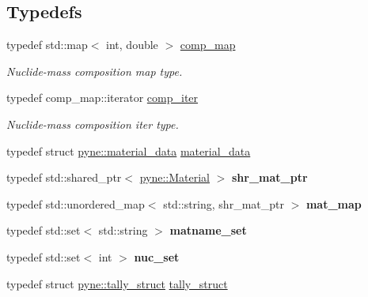 \subsection*{Typedefs}
\begin{DoxyCompactItemize}
\item 
\mbox{\label{namespacepyne_a86738cecccf4ce3f4ecc2ff6f45ce1a2}} 
typedef std\+::map$<$ int, double $>$ \hyperlink{namespacepyne_a86738cecccf4ce3f4ecc2ff6f45ce1a2}{comp\+\_\+map}
\begin{DoxyCompactList}\small\item\em Nuclide-\/mass composition map type. \end{DoxyCompactList}\item 
\mbox{\label{namespacepyne_af38f60eec2c4c80e6decc75c3b21a879}} 
typedef comp\+\_\+map\+::iterator \hyperlink{namespacepyne_af38f60eec2c4c80e6decc75c3b21a879}{comp\+\_\+iter}
\begin{DoxyCompactList}\small\item\em Nuclide-\/mass composition iter type. \end{DoxyCompactList}\item 
typedef struct \hyperlink{structpyne_1_1material__data}{pyne\+::material\+\_\+data} \hyperlink{namespacepyne_a30fee8818307aa6d8d45dc33ddee6008}{material\+\_\+data}
\item 
\mbox{\label{namespacepyne_a09ce84044845a9b4a1ec41e4205c6ce6}} 
typedef std\+::shared\+\_\+ptr$<$ \hyperlink{classpyne_1_1_material}{pyne\+::\+Material} $>$ {\bfseries shr\+\_\+mat\+\_\+ptr}
\item 
\mbox{\label{namespacepyne_adf98ac3f9a74de842afb72a3150cea9d}} 
typedef std\+::unordered\+\_\+map$<$ std\+::string, shr\+\_\+mat\+\_\+ptr $>$ {\bfseries mat\+\_\+map}
\item 
\mbox{\label{namespacepyne_a254553a1032f10261d2efd71dca90631}} 
typedef std\+::set$<$ std\+::string $>$ {\bfseries matname\+\_\+set}
\item 
\mbox{\label{namespacepyne_a5cc467c62fe926f7916689167e980689}} 
typedef std\+::set$<$ int $>$ {\bfseries nuc\+\_\+set}
\item 
typedef struct \hyperlink{structpyne_1_1tally__struct}{pyne\+::tally\+\_\+struct} \hyperlink{namespacepyne_a50f65e8f1e109c362c1cd737d0627941}{tally\+\_\+struct}
\end{DoxyCompactItemize}
